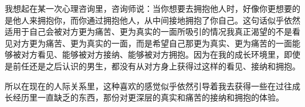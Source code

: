 我想起在某一次心理咨询里，咨询师说：当你想要去拥抱他人时，好像你更想要的是他人来拥抱你，而你通过拥抱他人，从中间接地拥抱了你自己。这句话似乎依然适用于自己会被对方更为痛苦、更为真实的一面所吸引的情况\pozhehao{}我真正渴望的不是看见对方更为痛苦、更为真实的一面，而是希望自己那更为真实、更为痛苦的一面能够被对方看见、能够被对方接纳、能够被对方拥抱。因为在我的成长环境里，即使是前任还是之后认识的男生，都没有从对方身上获得过这样的看见、接纳和拥抱。

所以在现在的人际关系里，这种喜欢的感觉似乎依然引导着我去获得一些在过往成长经历里一直缺乏的东西，那份对更深层的真实和痛苦的接纳和拥抱的体验。


